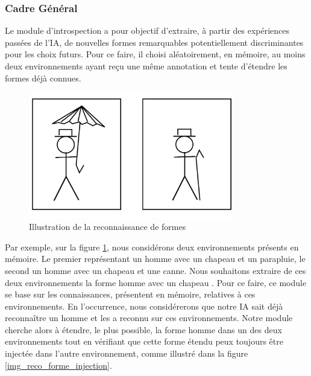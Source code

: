 
\subsubsection{Cadre Général}

Le module d'introspection a pour objectif d'extraire, à partir des expériences passées de l'IA, de nouvelles formes remarquables potentiellement discriminantes pour les choix futurs. Pour ce faire, il choisi aléatoirement, en mémoire, au moins deux environnements ayant reçu une même annotation et tente d'étendre les formes déjà connues.

\begin{figure}[H] 
\begin{center}
\includegraphics[width=0.8\textwidth]{files/raisonneur/reconnaissance_de_formes_0} 
\end{center}
\caption{Illustration de la reconnaissance de formes} 
\label{img_reco_forme_0}
\end{figure}

Par exemple, sur la figure \ref{img_reco_forme_0}, nous considérons deux environnements présents en mémoire. Le premier représentant un homme avec un chapeau et un parapluie, le second un homme avec un chapeau et une canne. Nous souhaitons extraire de ces deux environnements la forme \og homme avec un chapeau \fg{}. Pour ce faire, ce module se base sur les connaissances, présentent en mémoire, relatives à ces environnements. En l'occurrence, nous considérerons que notre IA sait déjà reconnaître un homme et les a reconnu sur ces environnements. Notre module cherche alors à étendre, le plus possible, la forme \og homme \fg dans un des deux environnements tout en vérifiant que cette forme étendu peux toujours être injectée dans l'autre environnement, comme illustré dans la figure \ref{img_reco_forme_injection}.

